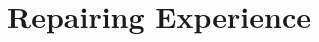 \documentclass[final]{scrreprt} %
\begin{document}
\chapter{Repairing Experience} %
\label{ch:repairing-experience}
\end{document}
